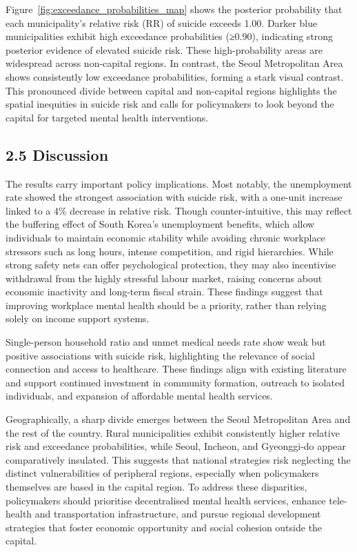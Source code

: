 \documentclass[11pt]{article}
\begin{document}
	Figure~\ref{fig:exceedance_probabilities_map} shows the posterior probability that each municipality's relative risk (RR) of suicide exceeds 1.00. Darker blue municipalities exhibit high exceedance probabilities (≥0.90), indicating strong posterior evidence of elevated suicide risk. These high-probability areas are widespread across non-capital regions. In contrast, the Seoul Metropolitan Area shows consistently low exceedance probabilities, forming a stark visual contrast. This pronounced divide between capital and non-capital regions highlights the spatial inequities in suicide risk and calls for policymakers to look beyond the capital for targeted mental health interventions.

	\subsection*{2.5 Discussion}
	
	The results carry important policy implications. Most notably, the unemployment rate showed the strongest association with suicide risk, with a one-unit increase linked to a 4\% decrease in relative risk. Though counter-intuitive, this may reflect the buffering effect of South Korea's unemployment benefits, which allow individuals to maintain economic stability while avoiding chronic workplace stressors such as long hours, intense competition, and rigid hierarchies. While strong safety nets can offer psychological protection, they may also incentivise withdrawal from the highly stressful labour market, raising concerns about economic inactivity and long-term fiscal strain. These findings suggest that improving workplace mental health should be a priority, rather than relying solely on income support systems.
	
	Single-person household ratio and unmet medical needs rate show weak but positive associations with suicide risk, highlighting the relevance of social connection and access to healthcare. These findings align with existing literature and support continued investment in community formation, outreach to isolated individuals, and expansion of affordable mental health services.
	
	Geographically, a sharp divide emerges between the Seoul Metropolitan Area and the rest of the country. Rural municipalities exhibit consistently higher relative risk and exceedance probabilities, while Seoul, Incheon, and Gyeonggi-do appear comparatively insulated. This suggests that national strategies risk neglecting the distinct vulnerabilities of peripheral regions, especially when policymakers themselves are based in the capital region. To address these disparities, policymakers should prioritise decentralised mental health services, enhance tele-health and transportation infrastructure, and pursue regional development strategies that foster economic opportunity and social cohesion outside the capital.
	
\end{document}
